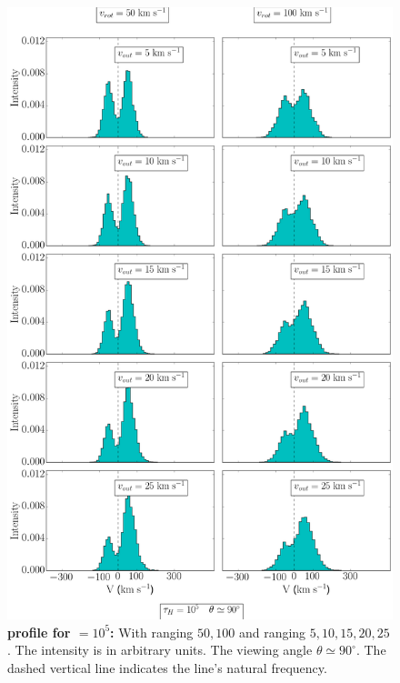 \begin{figure}[h!]
	\begin{center}
		\includegraphics[height=0.8\textheight]{./figures/chapter3/3_tau10E5_phi83-90}
	\end{center}
	\caption{\textbf{\lya profile for \tauh$=10^5$:} With \vrot ranging $50,100$ \kms and \vout ranging $5,10,15,20,25$ \kms. The intensity is in arbitrary units. The viewing angle $\theta \simeq 90^\circ$. The dashed vertical line indicates the \lya line's natural frequency. 
		\label{fig:3_tau10E5_phi83-90}}
\end{figure}

\newpage

